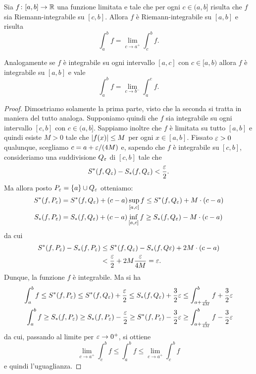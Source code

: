     \begin{theorem}
    \label{th:integrale_continuo}
    Sia $f\colon [a,b]\to {\mathbb R}$ una funzione limitata e tale
    che per ogni $c\in (a,b]$ risulta che $f$ sia Riemann-integrabile
    su $[c,b]$. Allora $f$ è Riemann-integrabile su $[a,b]$ e risulta
    \[
      \int_a^b f = \lim_{c\to a^+} \int_c^b f.
    \]
    
    Analogamente se $f$ è integrabile su ogni intervallo $[a,c]$
    con $c\in [a,b)$ allora $f$ è integrabile su $[a,b]$ e vale
    \[
      \int_a^b f = \lim_{c\to b^-} \int_a^c f.
    \]
    \end{theorem}
    \begin{proof}
    Dimostriamo solamente la prima parte, visto che la seconda si tratta in
    maniera del tutto analoga. Supponiamo quindi che $f$ sia integrabile su ogni
    intervallo $[c,b]$ con $c\in (a,b]$. Sappiamo inoltre che $f$ è limitata su
    tutto $[a,b]$ e quindi esiste $M>0$ tale che ${\left|f(x)\right|}\le M$ per ogni
    $x\in [a,b]$. Fissato $\varepsilon>0$ qualunque,
    scegliamo $c = a + \varepsilon/(4M)$ e, sapendo che $f$ è integrabile su $[c,b]$,
    consideriamo una suddivisione $Q_\varepsilon$ di $[c,b]$ tale che
    \[
      S^*(f, Q_\varepsilon) - S_*(f, Q_\varepsilon) < \frac {\varepsilon} 2.
    \]
    Ma allora posto $P_\varepsilon = {\left\{ a \right\}} \cup Q_\varepsilon$ otteniamo:
    \begin{align*}
      S^*(f,P_\varepsilon) &= S^*(f,Q_\varepsilon) + (c-a)\sup_{[a,c]} f
        \le S^*(f,Q_\varepsilon) + M \cdot (c-a)\\
      S_*(f,P_\varepsilon) &= S_*(f,Q_\varepsilon) + (c-a)\inf_{[a,c]} f
        \ge S_*(f,Q_\varepsilon) - M \cdot (c-a)
    \end{align*}
    da cui
    \begin{align*}
     S^*(f,P_\varepsilon)-S_*(f,P_\varepsilon)
     &\le S^*(f,Q_\varepsilon) - S_*(f,Q\varepsilon) + 2 M \cdot (c-a)\\
     &< \frac{\varepsilon}{2} + 2 M \frac{\varepsilon}{4M}
     = \varepsilon.
    \end{align*}
    Dunque, la funzione $f$ è integrabile. Ma si ha
    \begin{align*}
    \int_a^b f \le S^*(f,P_\varepsilon) \le S^*(f,Q_\varepsilon) + \frac{\varepsilon}{2}
    \le S_*(f,Q_\varepsilon) + \frac 3 2 \varepsilon
    \le \int_{a+\frac {\varepsilon}{4M}}^b f + \frac {3}{2} \varepsilon \\
    \int_a^b f \ge S_*(f,P_\varepsilon) \ge S_*(f,P_\varepsilon) - \frac{\varepsilon}{2}
    \ge S^*(f,P_\varepsilon) - \frac 3 2 \varepsilon
    \ge \int_{a+\frac {\varepsilon}{4M}}^b f - \frac {3}{2} \varepsilon
    \end{align*}
    da cui, passando al limite per $\varepsilon \to 0^+$, si ottiene
    \[
      \lim_{c\to a^+} \int_c^b f \le \int_a^b f \le \lim_{c\to a^+} \int_c^b f
    \]
    e quindi l'uguaglianza.
    \end{proof}
    
